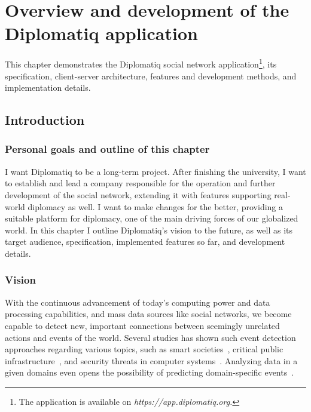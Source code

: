 \chapter{Overview and development of the Diplomatiq application}
\label{chapter:diplomatiq}

This chapter demonstrates the Diplomatiq social network application\footnote{The application is available on \emph{https://app.diplomatiq.org.}}, its specification, client-server architecture, features and development methods, and implementation details.

\section{Introduction}

\subsection{Personal goals and outline of this chapter}

I want Diplomatiq to be a long-term project. After finishing the university, I want to establish and lead a company responsible for the operation and further development of the social network, extending it with features supporting real-world diplomacy as well. I want to make changes for the better, providing a suitable platform for diplomacy, one of the main driving forces of our globalized world. In this chapter I outline Diplomatiq's vision to the future, as well as its target audience, specification, implemented features so far, and development details.

\subsection{Vision}

With the continuous advancement of today's computing power and data processing capabilities, and mass data sources like social networks, we become capable to detect new, important connections between seemingly unrelated actions and events of the world. Several studies has shown such event detection approaches regarding various topics, such as smart societies~\cite{smartsoc}, critical public infrastructure~\cite{tien2016detection}, and security threats in computer systems~\cite{merza2015investigative}. Analyzing data in a given domains even opens the possibility of predicting domain-specific events~\cite{6894591}.

